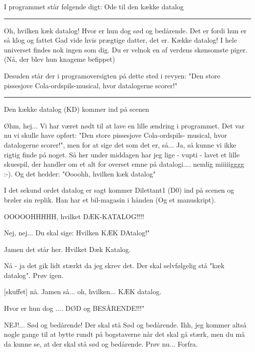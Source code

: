 \documentclass[a4paper,11pt]{article}
\begin{document}
\begin{song}
  \scene I programmet står følgende digt:
  Ode til den kække datalog

  \rule{20em}{.25pt}
  Oh, hvilken kæk datalog!
  Hvor er hun dog sød og bedårende.
  Det er fordi hun er så klog og fattet
  Gad vide hvis prægtige datter, det er.
  Kække datalog! I hele universet findes nok ingen som dig.
  Du er velnok en af verdens skønsomste piger.
  (Nå, der blev hun knageme befippet)
  
  Desuden står der i programoversigten på dette sted i revyen: "Den
  store pissesjove Cola-ordspils-musical, hvor datalogerne scorer!"
  \rule{20em}{.25pt}
\end{song} \newpage
\begin{sketch}

  

  \scene Den kække datalog (KD) kommer ind på scenen
  
   Øhm, hej... Vi har været nødt til at lave en lille ændring
  i programmet.  Det var nu vi skulle have opført: "Den store
  pissesjove Cola-ordspils- musical, hvor datalogerne scorer!", men
  for at sige det som det er, så...  Ja, så kunne vi ikke rigtig finde
  på noget. Så her under middagen har jeg lige - vupti - lavet et
  lille skuespil, der handler om et alt for overset emne på
  datalogi.... nemlig miiiiigggg :-). Og det hedder: "Oooohh, hvilken
  kæk datalog"
  
  \scene I det sekund ordet datalog er sagt kommer Dilettant1 (D0) ind
  på scenen og brøler sin replik. Han har et bil-magasin i hånden (Og
  et manuskript).

   OOOOOHHHHH, hvilket DÆK-KATALOG!!!!
  
   Nej, nej... Du skal sige: Hvilken KÆK DAtalog!"
  
   Jamen det står her.  Hvilket Dæk Katalog.
  
   Nå - ja det gik lidt stærkt da jeg skrev det. Der skal
  selvfølgelig stå "kæk datalog". Prøv igen.
  
  [skuffet] nå. Jamen så... oh, hvilken... KÆK datalog.
  
  
   Hvor er hun dog .... DØD og BESÅRENDE!!!"
  
   NEJ!... Sød og bedårende! Der skal stå Sød og bedårende.
  Ihh, jeg kommer altså nogle gange til at bytte rundt på bogstaverne
  når det skal gå stærk, men du må da kunne se, at der skal stå sød og
  bedårende. Prøv nu... Forfra.
  

\end{sketch}
\end{document}
